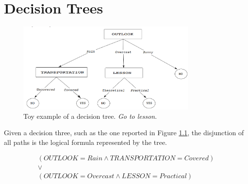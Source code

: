 \chapter{Decision Trees}
\label{cha:decision_trees}

\begin{figure}[H]
    \centering
    \includegraphics[width=0.8\textwidth]{images/DT.png}
    \caption{Toy example of a decision tree. \textit{Go to lesson}.}
    \label{dt_example}
\end{figure}

Given a decision three, such as the one reported in Figure \ref{dt_example}, the disjunction of all paths is the logical formula represented by the tree.


\begin{gather*}
    (\mathit{OUTLOOK}=\mathit{Rain} \wedge \mathit{TRANSPORTATION}=\mathit{Covered})\\
    \vee \\ 
    (\mathit{OUTLOOK}=\mathit{Overcast} \wedge \mathit{LESSON}=\mathit{Practical})
\end{gather*}

